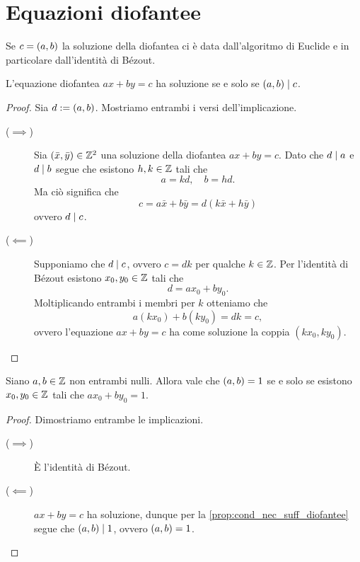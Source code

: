 \section{Equazioni diofantee}


\begin{remark}
    Se $c = \left(a, b\right)$ la soluzione della diofantea ci è data dall'algoritmo di Euclide e in particolare dall'identità di Bézout.
\end{remark}

\begin{proposition}
    \label{prop:cond_nec_suff_diofantee}
    L'equazione diofantea $ax + by = c$ ha soluzione se e solo se $\left(a, b\right) \mid c$.
\end{proposition}
\begin{proof}
    Sia $d := \left(a, b\right)$. Mostriamo entrambi i versi dell'implicazione.
    \begin{description}
        \item[($\implies$)] Sia $(\bar x, \bar y) \in \mathbb{Z}^2$ una soluzione della diofantea $ax + by = c$. Dato che $d \mid a$ e $d \mid b$ segue che esistono $h, k \in \mathbb{Z}$ tali che \[
            a = kd, \quad b = hd.    
        \] Ma ciò significa che \[
            c = a\bar x + b\bar y = d(k\bar x + h\bar y)    
        \] ovvero $d \mid c$.
        \item[($\impliedby$)] Supponiamo che $d \mid c$, ovvero $c = dk$ per qualche $k \in \mathbb{Z}$. Per l'identità di Bézout esistono $x_0, y_0 \in \mathbb{Z}$ tali che \[
            d = ax_0 + by_0.    
        \] Moltiplicando entrambi i membri per $k$ otteniamo che \[
            a(kx_0) + b(ky_0) = dk = c,    
        \] ovvero l'equazione $ax + by = c$ ha come soluzione la coppia $(kx_0, ky_0)$. \qedhere
    \end{description}
\end{proof}

\begin{corollary} \label{cor:mcd=1_sse_comb_lin_1}
    Siano $a, b \in \mathbb{Z}$ non entrambi nulli. Allora vale che $\left(a, b\right) = 1$ se e solo se esistono $x_0, y_0 \in \mathbb{Z}$ tali che $ax_0 + by_0 = 1$.
\end{corollary}
\begin{proof}
    Dimostriamo entrambe le implicazioni.
    \begin{description}
        \item[($\implies$)] È l'identità di Bézout.
        \item[($\impliedby$)] $ax + by = c$ ha soluzione, dunque per la \autoref{prop:cond_nec_suff_diofantee} segue che $\left(a, b\right) \mid 1$, ovvero $\left(a, b\right) = 1$.
    \end{description}
\end{proof}

